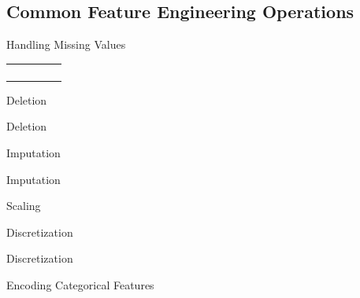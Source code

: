 \subsection{Common Feature Engineering Operations}

\begin{frame}{Handling Missing Values}
  \footnotesize
  \renewcommand{\arraystretch}{1.25}
  \begin{tabular}{@{}lllll@{}}
    \toprule
     & & & & \\
    \midrule
     & & & & \\
     & & & & \\
     & & & & \\
     & & & & \\
    \bottomrule
  \end{tabular}
\end{frame}

\begin{frame}{Deletion}
  \begin{tddef}{Deletion}
  \end{tddef}
\end{frame}

\begin{frame}{Imputation}
  \begin{tdcodet}{Imputation}
  \end{tdcodet}
\end{frame}

\begin{frame}{Scaling}
  \begin{withmargin}
    \begin{tdmain}
    \end{tdmain}
    \begin{tdmargin}
    \end{tdmargin}
  \end{withmargin}
\end{frame}

\begin{frame}{Discretization}
  \begin{tdcodet}{Discretization}
  \end{tdcodet}
\end{frame}

\begin{frame}{Encoding Categorical Features}
  \begin{withmargin}
    \begin{tdmain}
    \end{tdmain}
    \begin{tdmargin}
    \end{tdmargin}
  \end{withmargin}
\end{frame}


